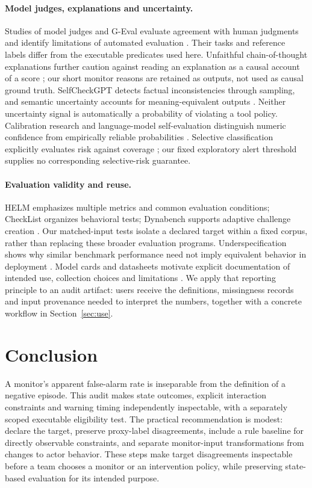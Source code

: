 \documentclass[10pt]{article}
\begin{document}
\paragraph{Model judges, explanations and uncertainty.}
Studies of model judges and G-Eval evaluate agreement with human judgments and identify limitations of automated evaluation \citep{zheng2023judge,liu2023geval}. Their tasks and reference labels differ from the executable predicates used here. Unfaithful chain-of-thought explanations further caution against reading an explanation as a causal account of a score \citep{turpin2023unfaithful}; our short monitor reasons are retained as outputs, not used as causal ground truth. SelfCheckGPT detects factual inconsistencies through sampling, and semantic uncertainty accounts for meaning-equivalent outputs \citep{manakul2023selfcheck,kuhn2023semantic}. Neither uncertainty signal is automatically a probability of violating a tool policy. Calibration research and language-model self-evaluation distinguish numeric confidence from empirically reliable probabilities \citep{guo2017calibration,kadavath2022know}. Selective classification explicitly evaluates risk against coverage \citep{geifman2017selective}; our fixed exploratory alert threshold supplies no corresponding selective-risk guarantee.

\paragraph{Evaluation validity and reuse.}
HELM emphasizes multiple metrics and common evaluation conditions; CheckList organizes behavioral tests; Dynabench supports adaptive challenge creation \citep{liang2022helm,ribeiro2020checklist,kiela2021dynabench}. Our matched-input tests isolate a declared target within a fixed corpus, rather than replacing these broader evaluation programs. Underspecification shows why similar benchmark performance need not imply equivalent behavior in deployment \citep{damour2022underspecification}. Model cards and datasheets motivate explicit documentation of intended use, collection choices and limitations \citep{mitchell2019modelcards,gebru2021datasheets}. We apply that reporting principle to an audit artifact: users receive the definitions, missingness records and input provenance needed to interpret the numbers, together with a concrete workflow in Section~\ref{sec:use}.

\section{Conclusion}
A monitor's apparent false-alarm rate is inseparable from the definition of a negative episode. This audit makes state outcomes, explicit interaction constraints and warning timing independently inspectable, with a separately scoped executable eligibility test. The practical recommendation is modest: declare the target, preserve proxy-label disagreements, include a rule baseline for directly observable constraints, and separate monitor-input transformations from changes to actor behavior. These steps make target disagreements inspectable before a team chooses a monitor or an intervention policy, while preserving state-based evaluation for its intended purpose.
\end{document}
